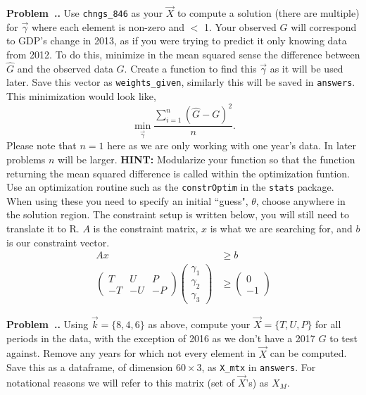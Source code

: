 \documentclass[11pt]{article}
\newcounter{prob} %
\newenvironment{prob}[1][]{\refstepcounter{prob}\par\noindent\smallskip
   \textbf{Problem~\thesection .\theprob. #1} \rmfamily}{\smallskip}
\begin{document}
\begin{prob}
Use \texttt{chngs\_846} as your $\vec{X}$ to compute a solution (there are multiple) for $\vec{\gamma}$ where each element is non-zero and $<$ 1. Your observed $G$ will correspond to GDP's change in 2013, as if you were trying to predict it only knowing data from 2012. To do this, minimize in the mean squared sense the difference between $\hat{G}$ and the observed data $G$. Create a function to find this $\vec{\gamma}$ as it will be used later. Save this vector as \texttt{weights\_given}, similarly this will be saved in \texttt{answers}. This minimization would look like,
\[
\min_{\vec{\gamma}} \frac{\sum_{i=1}^n(\hat{G} - G)^2}{n}.
\]
Please note that $n=1$ here as we are only working with one year's data. In later problems $n$ will be larger.
\newline
\textbf{HINT:} Modularize your function so that the function returning the mean squared difference is called within the optimization funtion. Use an optimization routine such as the \texttt{constrOptim} in the \texttt{stats} package. When using these you need to specify an initial ``guess", $\theta$, choose anywhere in the solution region. The constraint setup is written below, you will still need to translate it to R. $A$ is the constraint matrix, $x$ is what we are searching for, and $b$ is our constraint vector.
\begin{align*}
Ax &\geq b \\
\begin{pmatrix}
T & U & P \\
-T & -U & -P
\end{pmatrix}
\begin{pmatrix}
\gamma_1 \\
\gamma_2 \\
\gamma_3
\end{pmatrix}
&\geq
\begin{pmatrix}
0 \\
-1
\end{pmatrix}
\end{align*}
\end{prob}
\begin{prob}
Using $\vec{k}=\{8,4,6\}$ as above, compute your $\vec{X}=\{T, U, P\}$ for all periods in the data, with the exception of 2016 as we don't have a 2017 $G$ to test against. Remove any years for which not every element in $\vec{X}$ can be computed. Save this as a dataframe, of dimension $60\times3$, as \texttt{X\_mtx} in \texttt{answers}. For notational reasons we will refer to this matrix (set of $\vec{X}$'s) as $X_M$.
\end{prob}
\end{document}
